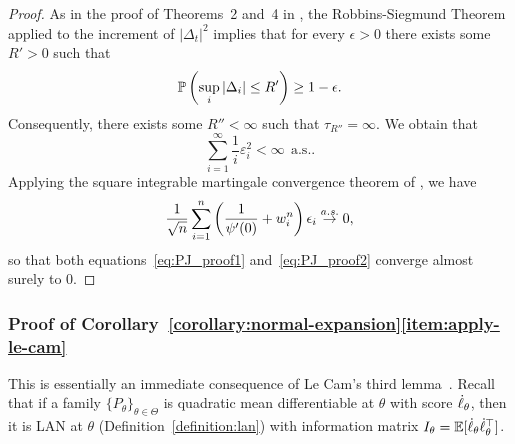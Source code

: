 \begin{proof}
 As in the proof of Theorems~2 and~4 in \cite{polyak1992acceleration}, the Robbins-Siegmund Theorem \cite{robbins1971convergence} applied to the increment of $|\Delta_t|^2$ implies that for every 
  $\epsilon>0$ there exists some $R'>0$ such that
  \begin{align}
  \label{eq:sup_delta}
  \mathbb{P}\left(\sup_i |\Delta_i| \le R' \right) \ge 1-\epsilon.
  \end{align} 
Consequently, there exists some $R'' < \infty$ such that $\tau_{R''} = \infty$. 
We obtain that 
 \begin{equation*}
    \sum_{i = 1}^\infty \frac{1}{i}
    \varepsilon_i^2  < \infty
    ~~ \mbox{a.s.}.
  \end{equation*}
  Applying the square integrable martingale convergence
  theorem of \cite[Ex.~5.3.35]{Dembo16}, we have
  \begin{equation*}
    \frac{1}{\sqrt{n}} \sum_{i = 1}^n
    \left(\frac{1}{\psi'(0)} + w_i^n\right) \epsilon_i \stackrel{a.s.}{\rightarrow} 0,
  \end{equation*}
  so that both equations~\eqref{eq:PJ_proof1} and~\eqref{eq:PJ_proof2}
  converge almost surely to 0.
\end{proof}

\subsubsection*{Proof of
  Corollary~\ref{corollary:normal-expansion}\eqref{item:apply-le-cam}}

This is essentially an immediate consequence of Le Cam's third
lemma~\cite[Example 6.7]{VanDerVaart98}.
Recall~\cite[Thm.~7.2]{VanDerVaart98} that if
a family $\{P_\theta\}_{\theta \in \Theta}$ is quadratic mean differentiable
at $\theta$ with score $\dot{\ell}_\theta$, then
it is LAN at $\theta$ (Definition~\ref{definition:lan})
with information matrix $I_\theta = \mathbb{E}[\dot{\ell}_\theta \dot{\ell}_\theta^\top]$.

